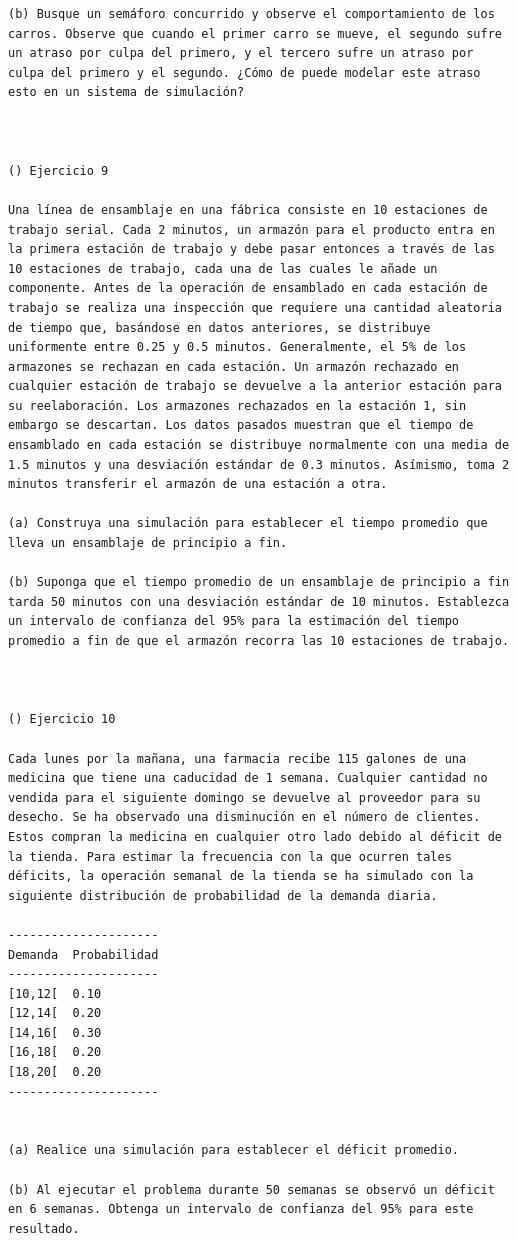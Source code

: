 \begin{verbatim}
(b) Busque un semáforo concurrido y observe el comportamiento de los carros. Observe que cuando el primer carro se mueve, el segundo sufre un atraso por culpa del primero, y el tercero sufre un atraso por culpa del primero y el segundo. ¿Cómo de puede modelar este atraso esto en un sistema de simulación?



() Ejercicio 9

Una línea de ensamblaje en una fábrica consiste en 10 estaciones de trabajo serial. Cada 2 minutos, un armazón para el producto entra en la primera estación de trabajo y debe pasar entonces a través de las 10 estaciones de trabajo, cada una de las cuales le añade un componente. Antes de la operación de ensamblado en cada estación de trabajo se realiza una inspección que requiere una cantidad aleatoria de tiempo que, basándose en datos anteriores, se distribuye uniformente entre 0.25 y 0.5 minutos. Generalmente, el 5% de los armazones se rechazan en cada estación. Un armazón rechazado en cualquier estación de trabajo se devuelve a la anterior estación para su reelaboración. Los armazones rechazados en la estación 1, sin embargo se descartan. Los datos pasados muestran que el tiempo de ensamblado en cada estación se distribuye normalmente con una media de 1.5 minutos y una desviación estándar de 0.3 minutos. Asímismo, toma 2 minutos transferir el armazón de una estación a otra.

(a) Construya una simulación para establecer el tiempo promedio que lleva un ensamblaje de principio a fin.

(b) Suponga que el tiempo promedio de un ensamblaje de principio a fin tarda 50 minutos con una desviación estándar de 10 minutos. Establezca un intervalo de confianza del 95% para la estimación del tiempo promedio a fin de que el armazón recorra las 10 estaciones de trabajo.



() Ejercicio 10

Cada lunes por la mañana, una farmacia recibe 115 galones de una medicina que tiene una caducidad de 1 semana. Cualquier cantidad no vendida para el siguiente domingo se devuelve al proveedor para su desecho. Se ha observado una disminución en el número de clientes. Estos compran la medicina en cualquier otro lado debido al déficit de la tienda. Para estimar la frecuencia con la que ocurren tales déficits, la operación semanal de la tienda se ha simulado con la siguiente distribución de probabilidad de la demanda diaria.

---------------------
Demanda  Probabilidad
---------------------
[10,12[  0.10
[12,14[  0.20
[14,16[  0.30
[16,18[  0.20
[18,20[  0.20
---------------------


(a) Realice una simulación para establecer el déficit promedio.

(b) Al ejecutar el problema durante 50 semanas se observó un déficit en 6 semanas. Obtenga un intervalo de confianza del 95% para este resultado.



\end{verbatim}
